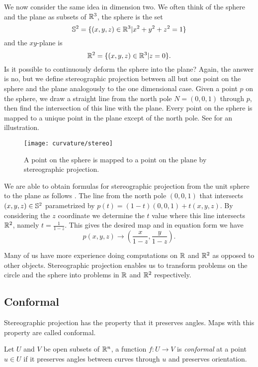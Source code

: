 We now consider the same idea in dimension two.
We often think of the sphere and the plane as subsets of $\mathbb{R}^3$,
the sphere is the set
$$\mathbb{S}^2=\{(x,y,z)\in \mathbb{R}^3 | x^2+y^2+z^2=1\}$$
and the $xy$-plane is
$$\mathbb{R}^2=\{(x,y,z)\in \mathbb{R}^3 | z=0\}.$$
Is it possible to continuously deform the sphere into the plane?
Again, the answer is no, but we define stereographic projection between all but one point
 on the sphere and the plane analogously to the one dimensional case.
 Given a point $p$ on the sphere, we draw a straight line
from the north pole $N=(0,0,1)$ through $p$, then find the intersection of
this line with the plane. Every point on the sphere is mapped
to a unique point in the plane except of the north pole.
See  for an illustration.





\begin{figure}[htb]
	\centering
	\texttt{[image: curvature/stereo]}
	\caption{A point on the sphere is mapped to a point on the plane by stereographic projection.}
	\label{fig:stereo1}
\end{figure}


We are able to obtain formulas for stereographic projection from
the unit sphere to the plane as follows \cite{christian-notes}.
The line from the north pole $(0,0,1)$ that intersects $(x,y,z)\in \mathbb{S}^2$ parametrized by 
$p(t)=(1-t)(0,0,1)+t(x,y,z)$. By considering the $z$ coordinate we determine the $t$ value where this line
intersects $\mathbb{R}^2$, namely $t=\frac{1}{1-z}.$
This gives the desired map  and in equation form we have
$$p(x,y,z)\to \left(\frac{x}{1-z},\frac{y}{1-z}\right).$$



Many of us have more experience doing computations on $\mathbb{R}$ and $\mathbb{R}^2$ as opposed
to other objects. Stereographic projection enables us to transform problems on
the circle and the sphere into problems in $\mathbb{R}$ and $\mathbb{R}^2$ respectively.

\subsection{Conformal}


Stereographic projection has the property that it preserves angles.
Maps with this property are called conformal. 
\begin{definition}[Conformal]\label{def:conformal}
	Let $U$ and $V$ be open subsets of $\mathbb{R}^n$, a function $f:U\to V$ is
	\emph{conformal} at a point $u\in U$ if it preserves angles between curves
	through $u$ and preserves orientation.
\end{definition}

